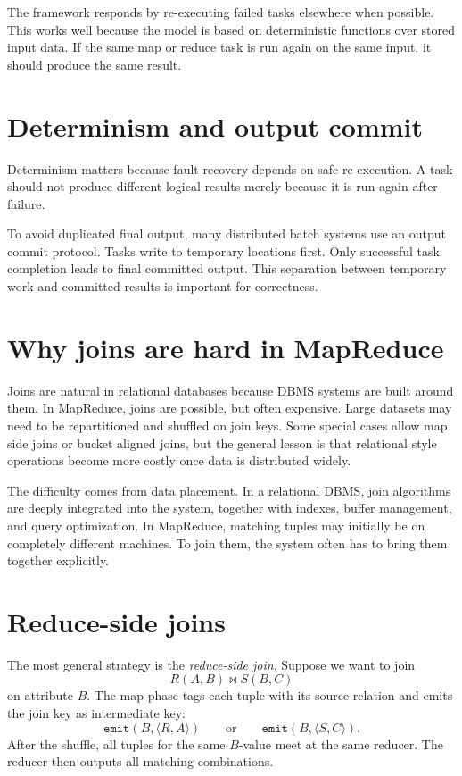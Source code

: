 \documentclass[11pt,a4paper,openany]{book}
\begin{document}
The framework responds by re-executing failed tasks elsewhere when possible. This works well because the model is based on deterministic functions over stored input data. If the same map or reduce task is run again on the same input, it should produce the same result.

\section{Determinism and output commit}
Determinism matters because fault recovery depends on safe re-execution. A task should not produce different logical results merely because it is run again after failure.

To avoid duplicated final output, many distributed batch systems use an output commit protocol. Tasks write to temporary locations first. Only successful task completion leads to final committed output. This separation between temporary work and committed results is important for correctness.

\section{Why joins are hard in MapReduce}
Joins are natural in relational databases because DBMS systems are built around them. In MapReduce, joins are possible, but often expensive. Large datasets may need to be repartitioned and shuffled on join keys. Some special cases allow map side joins or bucket aligned joins, but the general lesson is that relational style operations become more costly once data is distributed widely.

The difficulty comes from data placement. In a relational DBMS, join algorithms are deeply integrated into the system, together with indexes, buffer management, and query optimization. In MapReduce, matching tuples may initially be on completely different machines. To join them, the system often has to bring them together explicitly.

\section{Reduce-side joins}
The most general strategy is the \emph{reduce-side join}. Suppose we want to join
\[
R(A,B)\Join S(B,C)
\]
on attribute \(B\). The map phase tags each tuple with its source relation and emits the join key as intermediate key:
\[
\texttt{emit}(B,\langle R,A\rangle)
\qquad\text{or}\qquad
\texttt{emit}(B,\langle S,C\rangle).
\]
After the shuffle, all tuples for the same \(B\)-value meet at the same reducer. The reducer then outputs all matching combinations.
\end{document}
